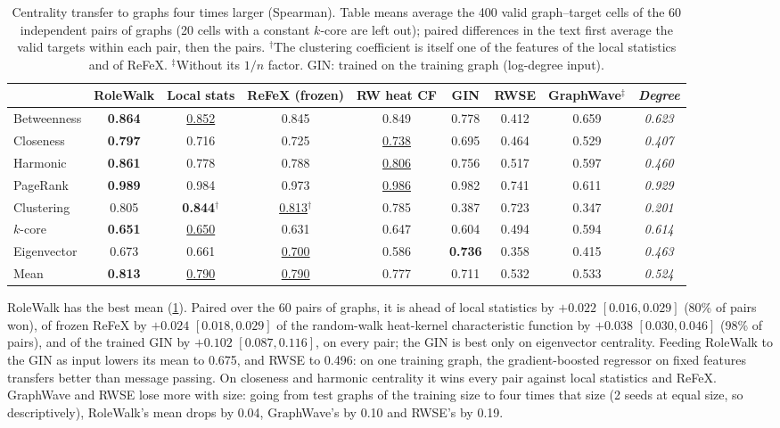 \documentclass[10pt]{article}
\theoremstyle{definition}
\newcommand{\best}[1]{\textbf{#1}}
\newcommand{\second}[1]{\underline{#1}}
\begin{document}
\begin{table}[t]
\centering
\caption{Centrality transfer to graphs four times larger (Spearman). Table means average the 400 valid graph--target cells of the 60 independent pairs of graphs (20 cells with a constant $k$-core are left out); paired differences in the text first average the valid targets within each pair, then the pairs. $^\dagger$The clustering coefficient is itself one of the features of the local statistics and of ReFeX. $^\ddagger$Without its $1/n$ factor. GIN: trained on the training graph (log-degree input).}
\label{tab:centrality}
\small
\setlength{\tabcolsep}{4pt}
\begin{tabular}{lcccccccc}
\toprule
& RoleWalk & Local stats & ReFeX (frozen) & RW heat CF & GIN & RWSE & GraphWave$^\ddagger$ & \emph{Degree} \\
\midrule
Betweenness & \best{0.864} & \second{0.852} & 0.845 & 0.849 & 0.778 & 0.412 & 0.659 & \emph{0.623} \\
Closeness & \best{0.797} & 0.716 & 0.725 & \second{0.738} & 0.695 & 0.464 & 0.529 & \emph{0.407} \\
Harmonic & \best{0.861} & 0.778 & 0.788 & \second{0.806} & 0.756 & 0.517 & 0.597 & \emph{0.460} \\
PageRank & \best{0.989} & 0.984 & 0.973 & \second{0.986} & 0.982 & 0.741 & 0.611 & \emph{0.929} \\
Clustering & 0.805 & \best{0.844}$^\dagger$ & \second{0.813}$^\dagger$ & 0.785 & 0.387 & 0.723 & 0.347 & \emph{0.201} \\
$k$-core & \best{0.651} & \second{0.650} & 0.631 & 0.647 & 0.604 & 0.494 & 0.594 & \emph{0.614} \\
Eigenvector & 0.673 & 0.661 & \second{0.700} & 0.586 & \best{0.736} & 0.358 & 0.415 & \emph{0.463} \\
\midrule
Mean & \best{0.813} & \second{0.790} & \second{0.790} & 0.777 & 0.711 & 0.532 & 0.533 & \emph{0.524} \\
\bottomrule
\end{tabular}
\end{table}

RoleWalk has the best mean (\cref{tab:centrality}).
Paired over the 60 pairs of graphs, it is ahead of local statistics by $+0.022$ $[0.016,0.029]$ (80\% of pairs won), of frozen ReFeX by $+0.024$ $[0.018,0.029]$ of the random-walk heat-kernel characteristic function by $+0.038$ $[0.030,0.046]$ (98\% of pairs), and of the trained GIN by $+0.102$ $[0.087, 0.116]$, on every pair; the GIN is best only on eigenvector centrality. Feeding RoleWalk to the GIN as input lowers its mean to 0.675, and RWSE to 0.496: on one training graph, the gradient-boosted regressor on fixed features transfers better than message passing.
On closeness and harmonic centrality it wins every pair against local statistics and ReFeX.
GraphWave and RWSE lose more with size: going from test graphs of the training size to four times that size (2 seeds at equal size, so descriptively), RoleWalk's mean drops by 0.04, GraphWave's by 0.10 and RWSE's by 0.19.
\end{document}
